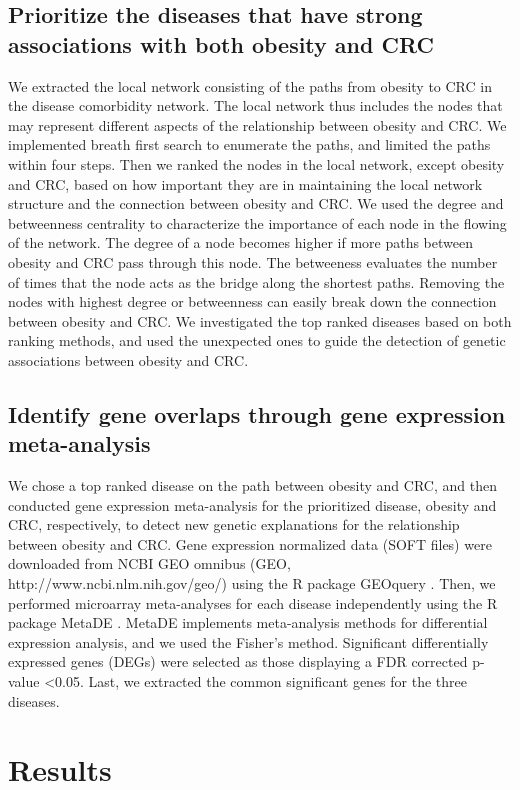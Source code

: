 \subsection{Prioritize the diseases that have strong associations with both obesity and CRC}
We extracted the local network consisting of  the paths from obesity to CRC in the disease comorbidity network. The local network thus includes the nodes that may represent different aspects of the relationship between obesity and CRC. We implemented breath first search to enumerate the paths, and limited the paths within four steps.
Then we ranked the nodes in the local network, except obesity and CRC, based on how important they are in maintaining the local network structure and the connection between obesity and CRC. We used the degree and betweenness centrality to characterize the importance of each node in the flowing of the network. The degree of a node becomes higher if more paths between obesity and CRC pass through this node. The betweeness evaluates the number of times that the node acts as the bridge along the shortest paths. Removing the nodes with highest degree or betweenness can easily break down the connection between obesity and CRC. We investigated the top ranked diseases based on both ranking methods, and used the unexpected ones to guide the detection of genetic associations between obesity and CRC.

\subsection{Identify gene overlaps through gene expression meta-analysis}
We chose a top ranked disease on the path between obesity and CRC, and then conducted gene expression meta-analysis for the prioritized disease, obesity and CRC, respectively, to detect new genetic explanations for the relationship between obesity and CRC. Gene expression normalized data (SOFT files) were downloaded from NCBI GEO omnibus (GEO, http://www.ncbi.nlm.nih.gov/geo/) using the R package GEOquery \cite{davis2007geoquery}. Then, we performed microarray meta-analyses for each disease independently using the R package MetaDE \cite{wang2012r}. MetaDE implements meta-analysis methods for differential expression analysis, and we used the Fisher's method. Significant differentially expressed genes (DEGs) were selected as those displaying a FDR corrected p-value <0.05. Last, we extracted the common significant genes for the three diseases.

\section{Results}
